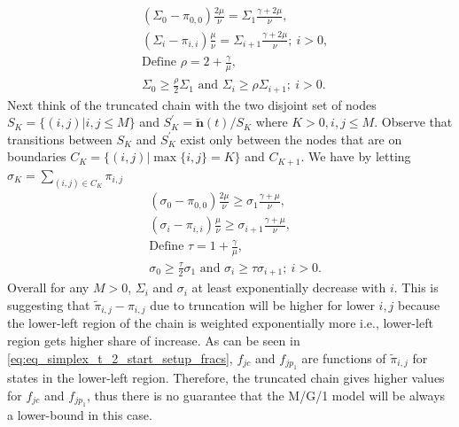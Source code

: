 \documentclass[sigconf,draft]{acmart}
\begin{document}
\begin{equation*}
  \begin{split}
  & (\Sigma_0 - \pi_{0,0}) \frac{2\mu}{\nu} = \Sigma_1 \frac{\gamma+2\mu}{\nu}, \\
  & (\Sigma_i - \pi_{i,i}) \frac{\mu}{\nu} = \Sigma_{i+1} \frac{\gamma+2\mu}{\nu}; ~i > 0, \\
  & \text{Define } \rho = 2 + \frac{\gamma}{\mu}, \\
  & \Sigma_0 \geq \frac{\rho}{2}\Sigma_1 \text{ and } \Sigma_i \geq \rho\Sigma_{i+1}; ~i > 0.
  \end{split}
\end{equation*}
Next think of the truncated chain with the two disjoint set of nodes $S_K = \{(i,j)|i,j \leq M\}$ and $S^\prime_K = \bm{\tilde{n}}(t)/S_K$ where $K > 0, i,j \leq M$. Observe that transitions between $S_K$ and $S^\prime_K$ exist only between the nodes that are on boundaries $C_K = \{(i,j)|\max\{i,j\}=K\}$ and $C_{K+1}$. We have by letting $\sigma_K = \sum_{(i,j) \in C_K} \pi_{i,j}$
\begin{equation*}
  \begin{split}
  & (\sigma_0 - \pi_{0,0}) \frac{2\mu}{\nu} \geq \sigma_1 \frac{\gamma+\mu}{\nu}, \\
  & (\sigma_i - \pi_{i,i}) \frac{\mu}{\nu} \geq \sigma_{i+1} \frac{\gamma+\mu}{\nu}, \\
  & \text{Define } \tau = 1 + \frac{\gamma}{\mu}, \\
  & \sigma_0 \geq \frac{\tau}{2}\sigma_1 \text{ and } \sigma_i \geq \tau \sigma_{i+1}; ~i > 0.
  \end{split}
\end{equation*}
Overall for any $M > 0$, $\Sigma_i$ and $\sigma_i$ at least exponentially decrease with $i$. This is suggesting that $\tilde{\pi}_{i,j} - \pi_{i,j}$ due to truncation will be higher for lower $i,j$ because the lower-left region of the chain is weighted exponentially more i.e., lower-left region gets higher share of increase. As can be seen in \eqref{eq:eq_simplex_t_2_start_setup_fracs}, $f_{jc}$ and $f_{jp_1}$ are functions of $\tilde{\pi}_{i,j}$ for states in the lower-left region. Therefore, the truncated chain gives higher values for $f_{jc}$ and $f_{jp_1}$, thus there is no guarantee that the M/G/1 model will be always a lower-bound in this case.
\end{document}
